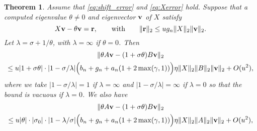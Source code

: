 \documentclass[12pt]{article}
\def\vec#1{{\bf #1}}
\newtheorem{theorem}{Theorem}
\begin{document}
\begin{theorem}
  \label{th:residual_bounds}
  Assume that \eqref{eq:shift_error} and \eqref{eq:Xerror} hold.
  Suppose that a computed eigenvalue $\theta\neq 0$ and eigenvector
  $\vec{v}$ of $X$ satisfy
  \begin{equation*}
    X\vec{v} - \theta \vec{v} = \vec{r},
    \qquad\text{with}\qquad
    \|\vec{r}\|_2 \leq u g_n \|X\|_2 \|\vec{v}\|_2.
  \end{equation*}
  Let $\lambda = \sigma + 1/\theta$, with $\lambda = \infty$ if
  $\theta = 0$.  Then
  \begin{multline}
    \label{eq:eq:res_bound_large_eig}
    \| \theta A \vec{v} - (1+\sigma \theta) B\vec{v} \|_2 \\
    \leq u |1+\sigma \theta| \cdot |1-\sigma/\lambda|
    \Big( b_n + g_n  + a_n (1+2\max(\gamma, 1))  \Big)\eta \|X\|_2\|B\|_2 \|\vec{v}\|_2 
    + O(u^2),
  \end{multline}
  where we take $|1-\sigma/\lambda| = 1$ if $\lambda = \infty$ and
  $|1-\sigma/\lambda| = \infty$ if $\lambda = 0$ so that the bound is
  vacuous if $\lambda = 0$.  We also have
  \begin{multline}
    \label{eq:eq:res_bound_small_eig}
    \| \theta A \vec{v} - (1+\sigma \theta) B\vec{v} \|_2 \\
    \leq u |\theta| \cdot |\sigma_0| \cdot |1-\lambda/\sigma|
    \Big( b_n + g_n  + a_n (1+2\max(\gamma, 1))  \Big)\eta \|X\|_2\|A\|_2 \|\vec{v}\|_2 
    + O(u^2),
  \end{multline}
\end{theorem}
\end{document}
